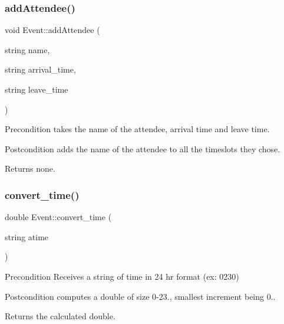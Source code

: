 \subsubsection{\texorpdfstring{add\+Attendee()}{addAttendee()}}
{\footnotesize\ttfamily void Event\+::add\+Attendee (\begin{DoxyParamCaption}\item[{string}]{name,  }\item[{string}]{arrival\+\_\+time,  }\item[{string}]{leave\+\_\+time }\end{DoxyParamCaption})}

\begin{DoxyPrecond}{Precondition}
takes the name of the attendee, arrival time and leave time. 
\end{DoxyPrecond}
\begin{DoxyPostcond}{Postcondition}
adds the name of the attendee to all the timeslots they chose. 
\end{DoxyPostcond}
\begin{DoxyReturn}{Returns}
none. 
\end{DoxyReturn}
\mbox{\label{class_event_a9446b101ed9d3fc30517e6d49784f0e8}} 
\subsubsection{\texorpdfstring{convert\+\_\+time()}{convert\_time()}}
{\footnotesize\ttfamily double Event\+::convert\+\_\+time (\begin{DoxyParamCaption}\item[{string}]{atime }\end{DoxyParamCaption})\hspace{0.3cm}{\ttfamily [private]}}

\begin{DoxyPrecond}{Precondition}
Receives a string of time in 24 hr format (ex\+: 0230) 
\end{DoxyPrecond}
\begin{DoxyPostcond}{Postcondition}
computes a double of size 0-\/23., smallest increment being 0.. 
\end{DoxyPostcond}
\begin{DoxyReturn}{Returns}
the calculated double. 
\end{DoxyReturn}
\mbox{\label{class_event_a8b44e4b7aabb33750c46fe75c1f667d7}} 
